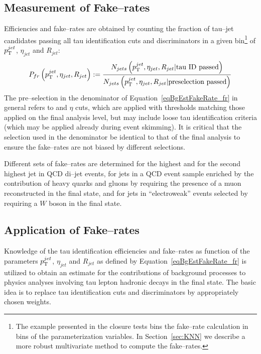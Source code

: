 \subsection{Measurement of Fake--rates}
%
Efficiencies and fake--rates are obtained by counting the fraction of tau--jet
candidates passing all tau identification cuts and discriminators in a given
bin\footnote{The example presented in the closure tests bins the fake--rate
calculation in bins of the parameterization variables.  In Section~\ref{sec:KNN}
we describe a more robust multivariate method to compute the fake--rates.} of
$p_{\mathrm{T}}^{jet}$, $\eta_{jet}$ and $R_{jet}$:
\begin{equation}
P_{fr} \left( p_{\mathrm{T}}^{jet}, \eta_{jet}, R_{jet} \right) := 
  \frac{N_{jets} \left( p_{\mathrm{T}}^{jet}, \eta_{jet}, R_{jet} \vert \mbox{tau ID passed} \right)}
       {N_{jets} \left( p_{\mathrm{T}}^{jet}, \eta_{jet}, R_{jet} \vert \mbox{preselection passed} \right)}
\label{eqBgEstFakeRate_fr}
\end{equation}
The pre--selection in the denominator of Equation~\ref{eqBgEstFakeRate_fr} in
general refers to \pt and $\eta$ cuts, which are applied with thresholds
matching those applied on the final analysis level, but may include
loose tau identification criteria (which may be applied \eg already during event
skimming).  It is critical that the selection used in the denominator be
identical to that of the final analysis to ensure the fake--rates are not biased
by different selections.

Different sets of fake--rates are determined for the highest \pt and for the
second highest \pt jet in QCD di--jet events, for jets in a QCD event sample
enriched by the contribution of heavy quarks and gluons by requiring the
presence of a muon reconstructed in the final state, and for jets in
``electroweak'' events selected by requiring a $W$ boson in the final state.

\subsection{Application of Fake--rates}
\label{sec:FakeRateApplication}
%
Knowledge of the tau identification efficiencies and fake--rates as function of
the parameters $p_{\mathrm{T}}^{jet}$, $\eta_{jet}$ and $R_{jet}$ as defined by
Equation~\ref{eqBgEstFakeRate_fr} is utilized to obtain an estimate for the
contributions of background processes to physics analyses involving tau lepton
hadronic decays in the final state.  The basic idea is to replace tau
identification cuts and discriminators by appropriately chosen weights.

